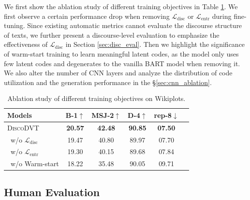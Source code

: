 \documentclass[11pt]{article}
\begin{document}
We first show the ablation study of different training objectives in Table \ref{tab:ablation}. We first observe a certain performance drop when removing
$\mathcal{L}_{\text{disc}}$ or $\mathcal{L}_{\text{entr}}$
during fine-tuning. Since existing automatic metrics cannot evaluate the discourse structure of texts, we further present a discourse-level evaluation to emphasize the effectiveness of $\mathcal{L}_{\text{disc}}$ in Section \ref{sec:disc_eval}. Then we highlight the significance of warm-start training to learn meaningful latent codes, as the model only uses few latent codes and degenerates to the vanilla BART model when removing it.
We also alter the number of CNN layers and analyze the distribution of code utilization and the generation performance in the \S{\ref{sec:cnn_ablation}}. 

\begin{table}[t!]
    \centering
    \scriptsize
    \begin{tabular}{l | cccc c}
    \toprule[1pt]
    Models & B-1$\uparrow$ & MSJ-2$\uparrow$ & D-4$\uparrow$ & rep-8$\downarrow$\\
    \midrule[0.5pt]
    \textsc{DiscoDVT} & \textbf{20.57} & \textbf{42.48} & \textbf{90.85} & \textbf{07.50} \\
    \ w/o $\mathcal{L}_{\text{disc}}$ & 19.47 & 40.80 & 89.97 & 07.70 \\
    \ w/o $\mathcal{L}_{\text{entr}}$ & 19.30 & 40.15 & 89.68 & 07.84 \\
    \ w/o Warm-start & 18.22 & 35.48 & 90.05 & 09.71 \\
    \bottomrule[1pt]
    \end{tabular}
    \caption{Ablation study of different training objectives on Wikiplots.}
    \label{tab:ablation}
\end{table}






\subsection{Human Evaluation}
\end{document}
